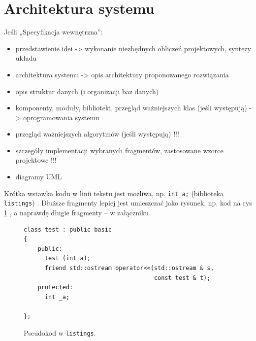\documentclass[a4paper,twoside,12pt]{book}
\begin{document}
\section{Architektura systemu}
\label{sec:Architektura-systemu}


Jeśli „Specyfikacja wewnętrzna”:
\begin{itemize}
\item przedstawienie idei -> wykonanie niezbędnych obliczeń projektowych, syntezy układu
\item architektura systemu -> opis architektury proponowanego rozwiązania
\item opis struktur danych (i organizacji baz danych)
\item komponenty, moduły, biblioteki, przegląd ważniejszych klas (jeśli występują) -> oprogramowania systemu
\item przegląd ważniejszych algorytmów (jeśli występują) !!!
\item szczegóły implementacji wybranych fragmentów, zastosowane wzorce projektowe !!!
\item diagramy UML
\end{itemize}





Krótka wstawka kodu w linii tekstu jest możliwa, np.  \lstinline|int a;| (biblioteka \texttt{listings})%
. 
Dłuższe fragmenty lepiej jest umieszczać jako rysunek, np. kod na rys \ref{fig:pseudokod:listings}%
, a naprawdę długie fragmenty – w załączniku.


\begin{figure}
\centering
\begin{lstlisting}
class test : public basic
{
    public:
      test (int a);
      friend std::ostream operator<<(std::ostream & s, 
                                     const test & t);
    protected:
      int _a;  
      
};
\end{lstlisting}
\caption{Pseudokod w \texttt{listings}.}
\label{fig:pseudokod:listings}
\end{figure}
\end{document}
